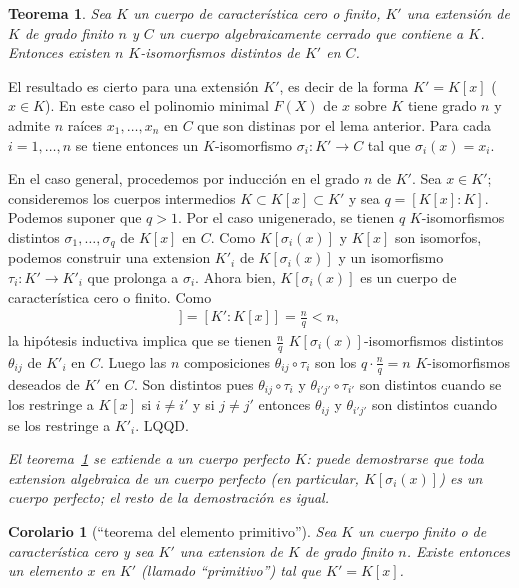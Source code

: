 \documentclass[bibtotoc,leqno,spanish]{amsbook}
\let\emph\relax %
\newcommand{\QED}{LQQD.}
\renewcommand{\to}[1][]{\xrightarrow{#1}}
\numberwithin{equation}{section}
\newenvironment{comm}%
	{\begin{list}{}{\setlength{\leftmargin}{2\parindent}\setlength{\topsep}{\baselineskip}}\item\itshape}
	{\end{list}}
\theoremstyle{note}
\theoremstyle{note}
\newtheorem{theorem}{Teorema}
\newtheorem*{corollary*}{Corolario}
\theoremstyle{rem}
\numberwithin{theorem}{section}
\numberwithin{proposition}{section}
\numberwithin{definition}{section}
\numberwithin{lemma}{section}
\numberwithin{corollary}{section}
\numberwithin{example}{section}
\numberwithin{footnote}{section}%
\begin{document}
\begin{theorem}\label{teo2.4.1}
Sea $K$ un cuerpo de caracter\'istica cero o finito, $K'$ una extensi\'on de $K$ de grado finito $n$
y $C$ un cuerpo algebraicamente cerrado que contiene a $K$. Entonces existen $n$ $K$-isomorfismos distintos
de $K'$ en $C$.
\end{theorem}

El resultado es cierto para una extensi\'on \emph{unigenerada} $K'$, es decir de la forma $K' = K[x]$
($x\in K$). En este caso el polinomio minimal $F(X)$ de $x$ sobre $K$ tiene grado $n$ y admite
$n$ ra\'ices $x_{1},\dots, x_{n}$ en $C$ que son distinas por el lema anterior. Para cada $i=1,\dots,n$ se
tiene entonces un $K$-isomorfismo $\sigma_{i}:K'\to C$ tal que $\sigma_{i}(x) = x_{i}$.

En el caso general, procedemos por inducci\'on en el grado $n$ de $K'$. Sea $x\in K'$; consideremos los cuerpos
intermedios $K\subset K[x]\subset K'$ y sea $q = [K[x]:K]$. Podemos suponer que $q > 1$. Por el caso unigenerado,
se tienen $q$ $K$-isomorfismos distintos $\sigma_{1},\dots,\sigma_{q}$ de $K[x]$ en $C$. Como
$K[\sigma_{i}(x)]$ y $K[x]$ son isomorfos, podemos construir una extension $K'_{i}$ de $K[\sigma_{i}(x)]$
y un isomorfismo $\tau_{i}:K'\to K'_{i}$ que prolonga a $\sigma_{i}$. Ahora bien, $K[\sigma_{i}(x)]$
es un cuerpo de caracter\'istica cero o finito. Como
\begin{gather*}
[K'_{i}:K[\sigma_{i}(x)]] = [K':K[x]] = \frac{n}{q} < n,
\end{gather*}
la hip\'otesis inductiva implica que se tienen $\frac{n}{q}$ $K[\sigma_{i}(x)]$-isomorfismos distintos
$\theta_{ij}$ de $K'_{i}$ en $C$. Luego las $n$ composiciones $\theta_{ij}\circ\tau_{i}$ son los
$q\cdot\frac{n}{q} = n$ $K$-isomorfismos deseados de $K'$ en $C$. Son distintos pues
$\theta_{ij}\circ\tau_{i}$ y $\theta_{i'j'}\circ\tau_{i'}$ son distintos cuando se los restringe a
$K[x]$ si $i\neq i'$ y si $j\neq j'$ entonces $\theta_{ij}$ y $\theta_{i'j'}$ son distintos cuando
se los restringe a $K'_{i}$. \QED

\begin{comm}
El teorema~\ref{teo2.4.1} se extiende a un cuerpo perfecto $K$: puede demostrarse que
toda extension algebraica de
un cuerpo perfecto (en particular, $K[\sigma_{i}(x)]$) es un cuerpo perfecto; el resto de
la demostraci\'on es igual.
\end{comm}

\begin{corollary*}[``teorema del elemento primitivo'']
Sea $K$ un cuerpo finito o de caracter\'istica cero y sea $K'$ una extension de $K$ de grado finito $n$.
Existe entonces un elemento $x$ en $K'$ (llamado ``primitivo'') tal que $K' = K[x]$.
\end{corollary*}
\end{document}
